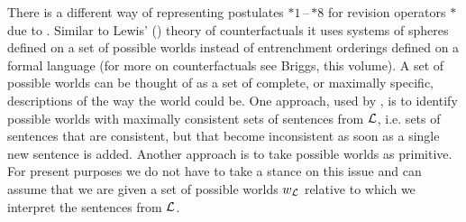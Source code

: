 There is a different way of representing postulates $*1$\,--\,$*8$ for revision operators $*$ due to \citet{g88}. Similar to Lewis' (\citeyear{l73}) theory of counterfactuals it uses systems of spheres defined on a set of possible worlds instead of entrenchment orderings defined on a formal language (for more on counterfactuals see Briggs, this volume). A set of possible worlds can be thought of as a set of complete, or maximally specific, descriptions of the way the world could be. One approach, used by \citet{g88}, is to identify possible worlds with maximally consistent sets of sentences from $\cal L$, i.e. sets of sentences that are consistent, but that become inconsistent as soon as a single new sentence is added. Another approach is to take possible worlds as primitive. For present purposes we do not have to take a stance on this issue and can assume that we are given a set of possible worlds $w_{\cal L}$ relative to which we interpret the sentences from $\cal L$.

